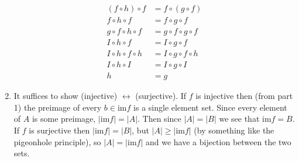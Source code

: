 \documentclass[]{article}
\newcommand{\abs}[1]{\left\vert #1 \right\vert}
\begin{document}
\begin{enumerate}
\begin{align}
(f \circ h) \circ f &= f \circ (g \circ f) \\
f \circ h \circ f &= f \circ g \circ f \\
g \circ f \circ h \circ f &= g \circ f \circ g \circ f \\
I \circ h \circ f &= I \circ g \circ f \\
I \circ h \circ f \circ h &= I \circ g \circ f \circ h \\
I \circ h \circ I &= I \circ g \circ I \\
h &= g
\end{align}
\item It suffices to show (injective) $\leftrightarrow$ (surjective). If $f$ is injective then (from part 1) the preimage of every $b \in \text{im}f$ is a single element set. Since every element of $A$ is some preimage, $\abs{\text{im}f} = \abs{A}$. Then since $\abs{A} = \abs{B}$ we see that $\text{im}f = B$. \\ If $f$ is surjective then $\abs{\text{im}f} = \abs{B}$, but $\abs{A} \geq \abs{\text{im}f}$ (by something like the pigeonhole principle), so $\abs{A} = \abs{\text{im}f}$ and we have a bijection between the two sets.
\end{enumerate}
\end{document}
